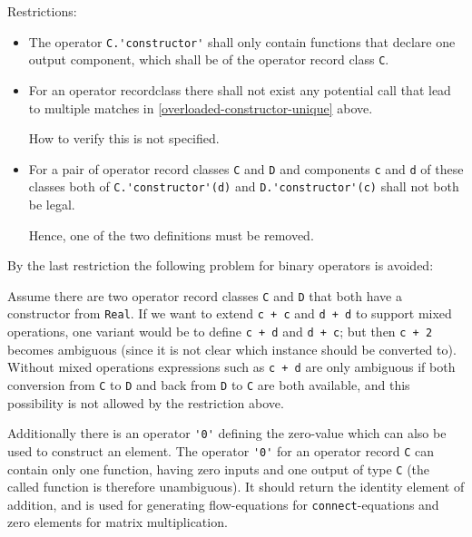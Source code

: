 Restrictions:
\begin{itemize}
\item
  The operator \lstinline!C.'constructor'! shall only contain functions that declare one output component, which shall be of the operator record class \lstinline!C!.
\item
  For an operator recordclass there shall not exist any potential call that lead to multiple matches in \cref{overloaded-constructor-unique} above.
  \begin{nonnormative}
  How to verify this is not specified.
  \end{nonnormative}
\item
  For a pair of operator record classes \lstinline!C! and \lstinline!D! and components \lstinline!c! and \lstinline!d! of these classes both of \lstinline!C.'constructor'(d)! and \lstinline!D.'constructor'(c)! shall not both be legal.
  \begin{nonnormative}
   Hence, one of the two definitions must be removed.
  \end{nonnormative}
\end{itemize}

\begin{nonnormative}
By the last restriction the following problem for binary operators is avoided:

Assume there are two operator record classes \lstinline!C! and \lstinline!D! that both have a constructor from \lstinline!Real!.
If we want to extend \lstinline!c + c! and \lstinline!d + d! to support mixed operations, one variant would be to define \lstinline!c + d! and \lstinline!d + c!; but then \lstinline!c + 2! becomes ambiguous (since it is not clear which instance should be converted to).
Without mixed operations expressions such as \lstinline!c + d! are only ambiguous if both conversion from \lstinline!C! to \lstinline!D! and back from \lstinline!D! to \lstinline!C! are both available, and this possibility is not allowed by the restriction above.
\end{nonnormative}

Additionally there is an operator \lstinline!'0'! defining the zero-value which can also be used to construct an element.
The operator \lstinline!'0'! for an operator record \lstinline!C! can contain only one function, having zero inputs and one output of type \lstinline!C! (the called function is therefore unambiguous).
It should return the identity element of addition, and is used for generating flow-equations for \lstinline!connect!-equations and zero elements for matrix multiplication.

